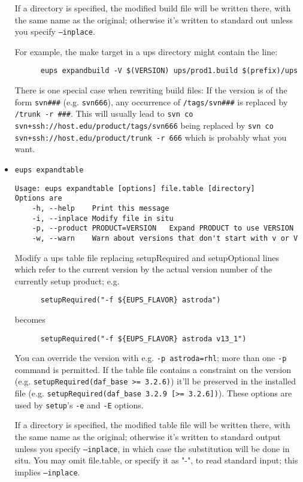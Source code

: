 \documentclass{article}
\newcommand{\code}[1]{\texttt{#1}}
\begin{document}
\begin{itemize}
If a directory is specified, the modified build file will be written
there, with the same name as the original; otherwise it's written to
standard out unless you specify \code{--inplace}.

For example, the make target in a ups directory might contain the line:
\begin{verbatim}
      eups expandbuild -V $(VERSION) ups/prod1.build $(prefix)/ups
\end{verbatim}				%

There is one special case when rewriting build files:  If the version
is of the form \code{svn\#\#\#} (e.g. \code{svn666}), any occurrence of
\code{/tags/svn\#\#\#} is replaced by \code{/trunk -r \#\#\#}. This will usually
lead to \code{svn co svn+ssh://host.edu/product/tags/svn666}
being replaced by \code{svn co svn+ssh://host.edu/product/trunk -r 666}
which is probably what you want.


  \item \code{eups expandtable}
\begin{verbatim}
Usage: eups expandtable [options] file.table [directory]
Options are
    -h, --help    Print this message
    -i, --inplace Modify file in situ
    -p, --product PRODUCT=VERSION   Expand PRODUCT to use VERSION
    -w, --warn    Warn about versions that don't start with v or V
\end{verbatim}

Modify a ups table file replacing setupRequired and setupOptional
lines which refer to the current version by the actual version number
of the currently setup product; e.g.
\begin{verbatim}
      setupRequired("-f ${EUPS_FLAVOR} astroda")
\end{verbatim}
becomes
\begin{verbatim}
      setupRequired("-f ${EUPS_FLAVOR} astroda v13_1")
\end{verbatim}
You can override the version with e.g. \code{-p astroda=rhl}; more
than one \code{-p} command is permitted.  If the table file contains
a constraint on the version (e.g. \code{setupRequired(daf\_base >= 3.2.6)})
it'll be preserved in the installed file (e.g. \code{setupRequired(daf\_base 3.2.9 [>= 3.2.6])}).
These options are used by \code{setup}'s \code{-e} and \code{-E} options.

If a directory is specified, the modified table file will be written
there, with the same name as the original; otherwise it's written to
standard output unless you specify \code{--inplace}, in which case the
substitution will be done in situ.
You may omit file.table, or specify it as "-", to read standard input;
this implies \code{--inplace}.


\end{itemize}
\end{document}
